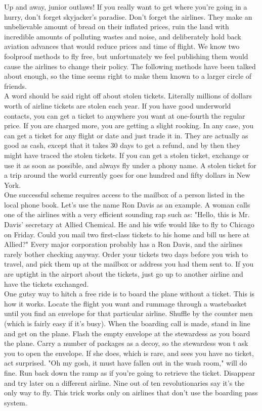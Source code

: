 \documentclass[11pt,twoside,a4paper]{book}
\begin{document}
Up and away, junior outlaws! If you really want to get where you're going in a hurry, don't forget skyjacker's paradise. Don't forget the airlines. They make an unbelievable amount of bread on their inflated prices, ruin the land with incredible amounts of polluting wastes and noise, and deliberately hold back aviation advances that would reduce prices and time of flight. We know two foolproof methods to fly free, but unfortunately we feel publishing them would cause the airlines to change their policy. The following methods have been talked about enough, so the time seems right to make them known to a larger circle of friends.~\\

A word should be said right off about stolen tickets. Literally millions of dollars worth of airline tickets are stolen each year. If you have good underworld contacts, you can get a ticket to anywhere you want at one-fourth the regular price. If you are charged more, you are getting a slight rooking. In any case, you can get a ticket for any flight or date and just trade it in. They are actually as good as cash, except that it takes 30 days to get a refund, and by then they might have traced the stolen tickets. If you can get a stolen ticket, exchange or use it as soon as possible, and always fly under a phony name. A stolen ticket for a trip around the world currently goes for one hundred and fifty dollars in New York.~\\

One successful scheme requires access to the mailbox of a person listed in the local phone book. Let's use the name Ron Davis as an example. A woman calls one of the airlines with a very efficient sounding rap such as: "Hello, this is Mr. Davis' secretary at Allied Chemical. He and his wife would like to fly to Chicago on Friday. Could you mail two first-class tickets to his home and bill us here at Allied?" Every major corporation probably has a Ron Davis, and the airlines rarely bother checking anyway. Order your tickets two days before you wish to travel, and pick them up at the mailbox or address you had them sent to. If you are uptight in the airport about the tickets, just go up to another airline and have the tickets exchanged.~\\

One gutsy way to hitch a free ride is to board the plane without a ticket. This is how it works. Locate the flight you want and rummage through a wastebasket until you find an envelope for that particular airline. Shuffle by the counter men (which is fairly easy if it's busy). When the boarding call is made, stand in line and get on the plane. Flash the empty envelope at the stewardess as you board the plane. Carry a number of packages as a decoy, so the stewardess won t ask you to open the envelope. If she does, which is rare, and sees you have no ticket, act surprised.  "Oh my gosh, it must have fallen out in the wash room," will do fine. Run back down the ramp as if you're going to retrieve the ticket. Disappear and try later on a different airline. Nine out of ten revolutionaries say it's the only way to fly. This trick works only on airlines that don't use the boarding pass system.~\\
\end{document}
